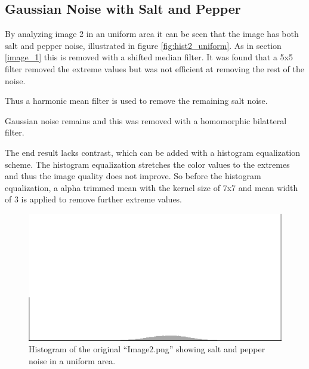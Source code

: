 \subsection{Gaussian Noise with Salt and Pepper}

By analyzing image 2 in an uniform area it can be seen that the image has both salt and pepper noise, illustrated in figure \ref{fig:hist2_uniform}.
As in section \ref{image_1} this is removed with a shifted median filter. 
It was found that a 5x5 filter removed the extreme values but was not efficient at removing the rest of the noise.

Thus a harmonic mean filter is used to remove the remaining salt noise.

Gaussian noise remains and this was removed with a homomorphic bilatteral filter.

The end result lacks contrast, which can be added with a histogram equalization scheme.
The histogram equalization stretches the color values to the extremes and thus the image quality does not improve.
So before the histogram equalization, a alpha trimmed mean with the kernel size of 7x7 and mean width of 3 is applied to remove further extreme values.

\begin{figure}[H]
\includegraphics[width = 0.8 \linewidth]{graphics/hist2_uniform.png}
\caption{Histogram of the original ``Image2.png'' showing salt and pepper noise in a uniform area.}
\label{fig:hist_pepper}
\end{figure}
